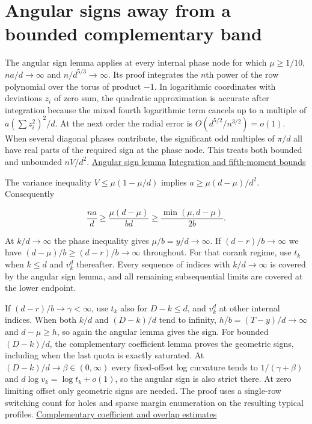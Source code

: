 \section{Angular signs away from a bounded complementary band}

The angular sign lemma applies at every internal phase node for which $\mu\ge1/10$, $na/d\to\infty$ and $n/d^{5/3}\to\infty$. Its proof integrates the $n$th power of the row polynomial over the torus of product $-1$. In logarithmic coordinates with deviations $z_i$ of zero sum, the quadratic approximation is accurate after integration because the mixed fourth logarithmic term cancels up to a multiple of $a(\sum z_i^2)^2/d$. At the next order the radial error is $O(d^{5/2}/n^{3/2})=o(1)$. When several diagonal phases contribute, the significant odd multiples of $\pi/d$ all have real parts of the required sign at the phase node. This treats both bounded and unbounded $nV/d^2$. \hyperref[sec:subquadratic-angular-nodes]{Angular sign lemma} \enspace \hyperref[sec:subquadratic-interior-saddle]{Integration and fifth-moment bounds}

The variance inequality $V\le\mu(1-\mu/d)$ implies $a\ge\mu(d-\mu)/d^2$. Consequently

\begin{equation*}
\frac{na}{d}\ge \frac{\mu(d-\mu)}{bd}
\ge\frac{\min(\mu,d-\mu)}{2b}.
\end{equation*}

At $k/d\to\infty$ the phase inequality gives $\mu/b=y/d\to\infty$. If $(d-r)/b\to\infty$ we have $(d-\mu)/b\ge(d-r)/b\to\infty$ throughout. For that corank regime, use $t_k$ when $k\le d$ and $v_k^d$ thereafter. Every sequence of indices with $k/d\to\infty$ is covered by the angular sign lemma, and all remaining subsequential limits are covered at the lower endpoint.

If $(d-r)/b\to\gamma<\infty$, use $t_k$ also for $D-k\le d$, and $v_k^d$ at other internal indices. When both $k/d$ and $(D-k)/d$ tend to infinity, $h/b=(T-y)/d\to\infty$ and $d-\mu\ge h$, so again the angular lemma gives the sign. For bounded $(D-k)/d$, the complementary coefficient lemma proves the geometric signs, including when the last quota is exactly saturated. At $(D-k)/d\to\beta\in(0,\infty)$ every fixed-offset log curvature tends to $1/(\gamma+\beta)$ and $d\log v_k=\log t_k+o(1)$, so the angular sign is also strict there. At zero limiting offset only geometric signs are needed. The proof uses a single-row switching count for holes and sparse margin enumeration on the resulting typical profiles. \hyperref[sec:subquadratic-scaling-corank-upper]{Complementary coefficient and overlap estimates}

